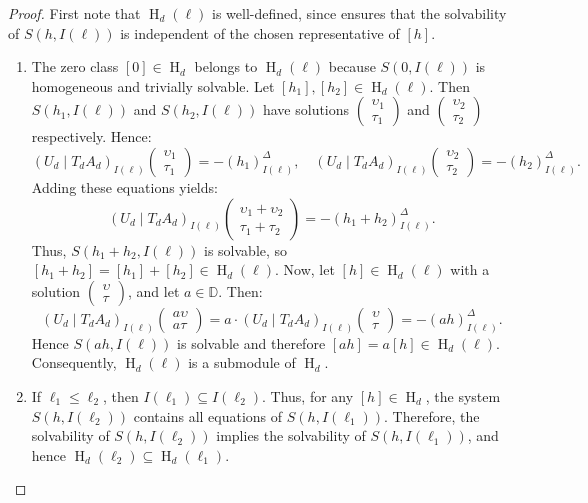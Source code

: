 \documentclass[10pt,a4paper]{amsart}
\DeclareMathOperator{\Ho}{H}
\newcommand{\bbd}{\mathbb{D}}
\begin{document}
\begin{proof}
First note that \(\Ho_d(\ell)\) is well-defined, since  ensures that the solvability of \(S(h,I(\ell))\) is independent of the chosen representative of \([h]\).
\begin{enumerate}[label=(\roman*)]
\item The zero class \([0] \in \Ho_d\) belongs to \(\Ho_d(\ell)\) because \(S(0, I(\ell))\) is homogeneous and trivially solvable.
Let \([h_1], [h_2] \in \Ho_d(\ell)\). Then \(S(h_1, I(\ell))\) and \(S(h_2, I(\ell))\) have solutions 
\(\left(\begin{array}{c}\upsilon_1 \\ \tau_1\end{array}\right)\)
and 
\(\left(\begin{array}{c}\upsilon_2 \\ \tau_2\end{array}\right)\) 
respectively. Hence:
\[
(U_{d} \mid T_{d} A_d)_{I(\ell)}
\left(\begin{array}{c}\upsilon_1 \\\tau_1\end{array}\right)= -(h_1)^{\Delta}_{I(\ell)}, 
\quad
(U_{d} \mid T_{d} A_d)_{I(\ell)}
\left(\begin{array}{c}\upsilon_2 \\\tau_2\end{array}\right)= -(h_2)^{\Delta}_{I(\ell)}.
\]
Adding these equations yields:
\[
(U_{d} \mid T_{d} A_d)_{I(\ell)}
\left(\begin{array}{c}\upsilon_1 + \upsilon_2 \\\tau_1 + \tau_2\end{array}\right)= -(h_1 + h_2)^{\Delta}_{I(\ell)}.
\]
Thus, \(S(h_1 + h_2, I(\ell))\) is solvable, so \([h_1 + h_2] = [h_1] + [h_2] \in \Ho_d(\ell)\). Now, let \([h] \in \Ho_d(\ell)\) with a solution 
\(\left(\begin{array}{c}\upsilon \\ \tau\end{array}\right)\), and let \(a \in \bbd\). Then:
\[
(U_{d} \mid T_{d} A_d)_{I(\ell)}
\left(\begin{array}{c}a\upsilon \\a\tau\end{array}\right)= a \cdot
(U_{d} \mid T_{d} A_d)_{I(\ell)}
\left(\begin{array}{c}\upsilon \\\tau\end{array}\right)= -(a h)^{\Delta}_{I(\ell)}.
\]
Hence \(S(ah, I(\ell))\) is solvable and therefore \([ah] = a[h] \in \Ho_d(\ell)\).
Consequently, \(\Ho_d(\ell)\) is a submodule of \(\Ho_d\).
\item If \(\ell_1 \leq \ell_2\), then \(I(\ell_1) \subseteq I(\ell_2)\). Thus, for any \([h] \in \Ho_d\), the system \(S(h,I(\ell_2))\) contains all equations of \(S(h,I(\ell_1))\). Therefore, the solvability of \(S(h,I(\ell_2))\) implies the solvability of \(S(h,I(\ell_1))\), and hence \(\Ho_d(\ell_2) \subseteq \Ho_d(\ell_1)\).


\end{enumerate}
\end{proof}
\end{document}
